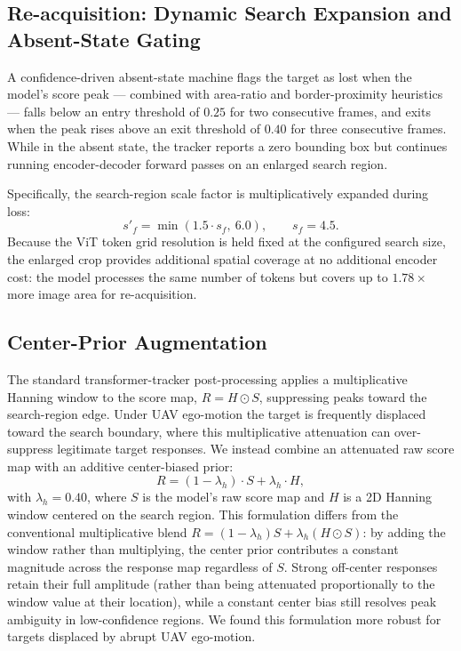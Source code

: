 \documentclass[10pt,twocolumn,letterpaper]{article}
\begin{document}
\subsection{Re-acquisition: Dynamic Search Expansion and Absent-State Gating}
\label{sec:absent}

A confidence-driven absent-state machine flags the target as lost when the model's score peak --- combined with area-ratio and border-proximity heuristics --- falls below an entry threshold of $0.25$ for two consecutive frames, and exits when the peak rises above an exit threshold of $0.40$ for three consecutive frames. While in the absent state, the tracker reports a zero bounding box but continues running encoder-decoder forward passes on an enlarged search region.

Specifically, the search-region scale factor is multiplicatively expanded during loss:
\begin{equation}
s'_f = \min(1.5 \cdot s_f,\ 6.0), \qquad s_f = 4.5.
\end{equation}
Because the ViT token grid resolution is held fixed at the configured search size, the enlarged crop provides additional spatial coverage at no additional encoder cost: the model processes the same number of tokens but covers up to $1.78\times$ more image area for re-acquisition.

\subsection{Center-Prior Augmentation}

The standard transformer-tracker post-processing applies a multiplicative Hanning window to the score map, $R = H \odot S$, suppressing peaks toward the search-region edge. Under UAV ego-motion the target is frequently displaced toward the search boundary, where this multiplicative attenuation can over-suppress legitimate target responses. We instead combine an attenuated raw score map with an additive center-biased prior:
\begin{equation}
R = (1 - \lambda_h) \cdot S + \lambda_h \cdot H,
\end{equation}
with $\lambda_h = 0.40$, where $S$ is the model's raw score map and $H$ is a 2D Hanning window centered on the search region. This formulation differs from the conventional multiplicative blend $R = (1-\lambda_h) S + \lambda_h (H \odot S)$: by adding the window rather than multiplying, the center prior contributes a constant magnitude across the response map regardless of $S$. Strong off-center responses retain their full amplitude (rather than being attenuated proportionally to the window value at their location), while a constant center bias still resolves peak ambiguity in low-confidence regions. We found this formulation more robust for targets displaced by abrupt UAV ego-motion.
\end{document}
